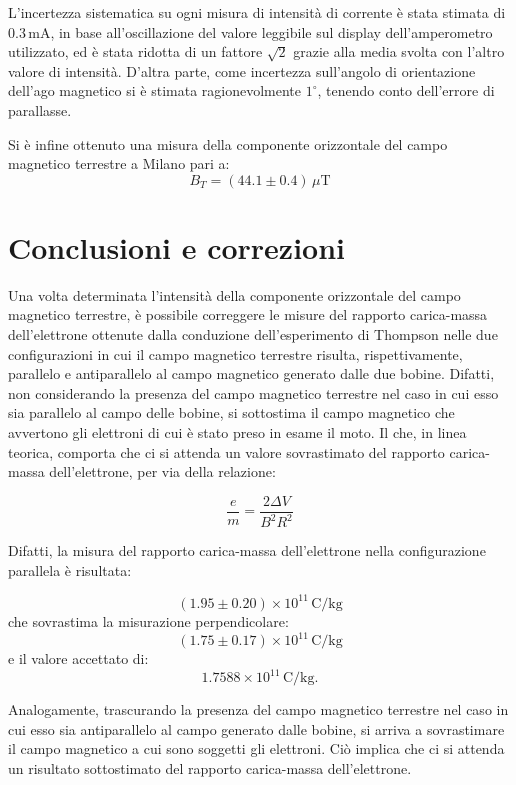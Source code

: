 \documentclass[a4paper,12pt]{article}
\begin{document}
L’incertezza sistematica su ogni misura di intensità di corrente è stata stimata di \( 0.3 \, \text{mA} \), in base all’oscillazione del valore leggibile sul display dell’amperometro utilizzato, ed è stata ridotta di un fattore \( \sqrt{2} \) grazie alla media svolta con l’altro valore di intensità. D’altra parte, come incertezza sull’angolo di orientazione dell’ago magnetico si è stimata ragionevolmente \( 1^\circ \), tenendo conto dell’errore di parallasse.

Si è infine ottenuto una misura della componente orizzontale del campo magnetico terrestre a Milano pari a:
\[
    B_T = (44.1 \pm 0.4) \, \mu\text{T}
\]

\section{Conclusioni e correzioni}

Una volta determinata l’intensità della componente orizzontale del campo magnetico terrestre, è possibile correggere le misure del rapporto carica-massa dell’elettrone ottenute dalla conduzione dell’esperimento di Thompson nelle due configurazioni in cui il campo magnetico terrestre risulta, rispettivamente, parallelo e antiparallelo al campo magnetico generato dalle due bobine. 
Difatti, non considerando la presenza del campo magnetico terrestre nel caso in cui esso sia parallelo al campo delle bobine, si sottostima il campo magnetico che avvertono gli elettroni di cui è stato preso in esame il moto. Il che, in linea teorica, comporta che ci si attenda un valore sovrastimato del rapporto carica-massa dell’elettrone, per via della relazione:

\begin{equation}
    \frac{e}{m} = \frac{2 \Delta V}{B^2 R^2} \label{eq:em_relation}
\end{equation}

Difatti, la misura del rapporto carica-massa dell’elettrone nella configurazione parallela è risultata:

\[
(1.95 \pm 0.20) \times 10^{11} \, \text{C/kg}
\]
che sovrastima la misurazione perpendicolare:
\[
(1.75 \pm 0.17) \times 10^{11} \, \text{C/kg}
\]
e il valore accettato di:
\[
1.7588 \times 10^{11} \, \text{C/kg}.
\]

Analogamente, trascurando la presenza del campo magnetico terrestre nel caso in cui esso sia antiparallelo al campo generato dalle bobine, si arriva a sovrastimare il campo magnetico a cui sono soggetti gli elettroni. Ciò implica che ci si attenda un risultato sottostimato del rapporto carica-massa dell’elettrone. 
\end{document}
